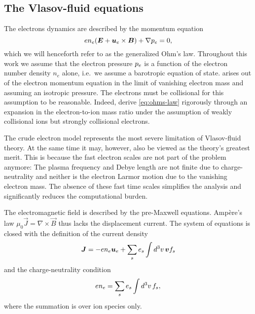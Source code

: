\documentclass[aps,pre,notitlepage,amsmath,amssymb,amsfonts,nobibnotes,nofootinbib]{revtex4-1}
\begin{document}
\subsection{The Vlasov-fluid equations}

The electrons dynamics are described by the momentum equation
\begin{equation}
  \label{eq:ohms-law}
  e n_e(\vec{E} + \ue\times\vec{B}) + \nabla\pe = 0,
\end{equation}
which we will henceforth refer to as the generalized Ohm's law. Throughout
this work we assume that the electron pressure $p_e$ is a function of the
electron number density $n_e$ alone, i.e.\ we assume a barotropic equation of
state.  arises out of the electron momentum equation in the
limit of vanishing electron mass and assuming an isotropic pressure. The
electrons must be collisional for this assumption to be reasonable. Indeed,
\citet{Rosin2011} derive \cref{eq:ohms-law} rigorously through an expansion in
the electron-to-ion mass ratio under the assumption of weakly collisional ions
but strongly collisional electrons.

The crude electron model represents the most severe limitation of Vlasov-fluid
theory. At the same time it may, however, also be viewed as the theory's
greatest merit. This is because the fast electron scales are not part of the
problem anymore: The plasma frequency and Debye length are not finite due to
charge-neutrality and neither is the electron Larmor motion due to the
vanishing electron mass. The absence of these fast time scales simplifies the
analysis and significantly reduces the computational burden.

The electromagnetic field is described by the pre-Maxwell equations. Ampère's
law $\mu_0\vec{J}=\nabla\times\vec{B}$ thus lacks the displacement current.
The system of equations is closed with the definition of the current density
\begin{equation}
  \label{eq:current}
  \vec{J} = -en_e\vec{u}_e + \sums \qs\int d^3v\,\vec{v} f_s%
\end{equation}
and the charge-neutrality condition
\begin{equation}
  \label{eq:charge-neutrality}
   en_e = \sums \qs\int d^3v\,f_s,
\end{equation}
where the summation is over ion species only.
\end{document}
